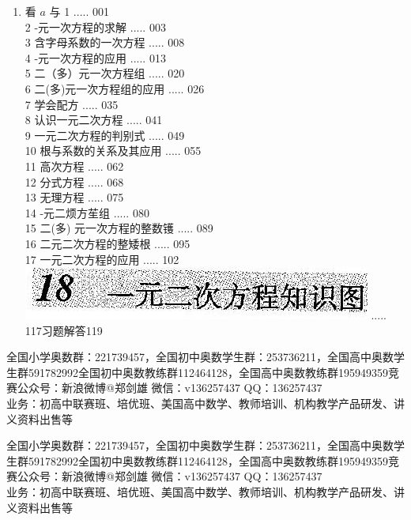\documentclass[10pt]{article}
\begin{document}
\begin{enumerate}
  \item 看 $a$ 与 1 ..... 001\\
2 -元一次方程的求解 ..... 003\\
3 含字母系数的一次方程 ..... 008\\
4 -元一次方程的应用 ..... 013\\
5 二（多）元一次方程组 ..... 020\\
6 二(多)元一次方程组的应用 ..... 026\\
7 学会配方 ..... 035\\
8 认识一元二次方程 ..... 041\\
9 一元二次方程的判别式 ..... 049\\
10 根与系数的关系及其应用 ..... 055\\
11 高次方程 ..... 062\\
12 分式方程 ..... 068\\
13 无理方程 ..... 075\\
14 -元二烦方苼组 ..... 080\\
15 二(多) 元一次方程的整数镬 ..... 089\\
16 二元二次方程的整矮根 ..... 095\\
17 一元二次方程的应用 ..... 102\\
\includegraphics[max width=\textwidth]{2024_10_30_26b590fd1106d28139f0g-005} ..... 117习题解答119
\end{enumerate}

全国小学奥数群：221739457，全国初中奥数学生群：253736211，全国高中奥数学生群591782992全国初中奥数教练群112464128，全国高中奥数教练群195949359竞赛公众号：新浪微博@郑剑雄 微信：v136257437 QQ：136257437\\
业务：初高中联赛班、培优班、美国高中数学、教师培训、机构教学产品研发、讲义资料出售等

全国小学奥数群：221739457，全国初中奥数学生群：253736211，全国高中奥数学生群591782992全国初中奥数教练群112464128，全国高中奥数教练群195949359竞赛公众号：新浪微博@郑剑雄 微信：v136257437 QQ：136257437\\
业务：初高中联赛班、培优班、美国高中数学、教师培训、机构教学产品研发、讲义资料出售等
\end{document}
